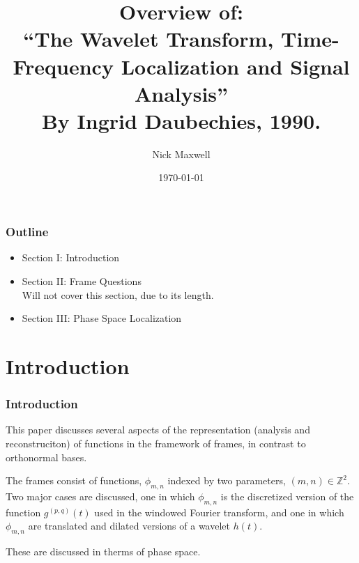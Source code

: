 \documentclass{beamer}
\title{Overview of: \\ ``The Wavelet Transform, Time-Frequency Localization and Signal Analysis'' \\ By Ingrid Daubechies, 1990.}
\author{Nick Maxwell    }
\date{\today}
\newcommand{\ints}[0] { \mathbb{Z}}
\begin{document}
\frame{\titlepage}



\begin{frame}
\frametitle{Outline}

\begin{itemize}
\item Section I: Introduction
\item Section II: Frame Questions \\
    Will not cover this section, due to its length.
\item Section III: Phase Space Localization
\end{itemize}

\end{frame}

\section{Introduction}

\begin{frame}
\frametitle{Introduction}

\begin{flushleft}
This paper discusses several aspects of the representation (analysis and reconstruciton) of functions in the framework of frames, in contrast to orthonormal bases.
\end{flushleft}

\begin{flushleft}
The frames consist of functions, $\phi_{m,n}$ indexed by two parameters, $(m,n) \in \ints^2$. Two major cases are discussed, one in which $\phi_{m,n}$ is the discretized version of the function $g^{(p,q)}(t)$ used in the windowed Fourier transform, and one in which $\phi_{m,n}$ are translated and dilated versions of a wavelet $h(t)$.
\end{flushleft}

\begin{flushleft}
These are discussed in therms of phase space.
\end{flushleft}

\end{frame}
\end{document}
